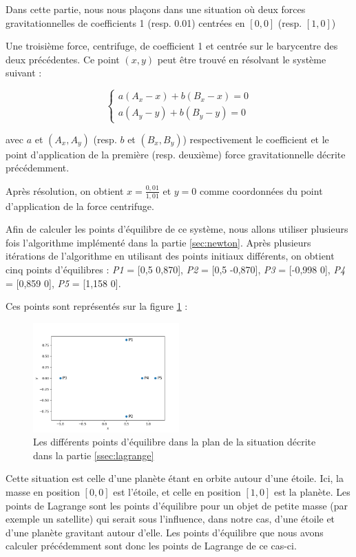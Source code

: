 Dans cette partie, nous nous plaçons dans une situation où deux forces gravitationnelles de coefficients 1 (resp. 0.01) centrées en $[0, 0]$ (resp. $[1, 0]$)

Une troisième force, centrifuge, de coefficient 1 et centrée sur le barycentre des deux précédentes. Ce point $(x, y)$ peut être trouvé en résolvant le système suivant :

$$
\begin{cases}
  a(A_x - x) + b(B_x - x) = 0 \\
  a(A_y - y) + b(B_y - y) = 0
\end{cases}
$$

avec $a$ et $(A_x, A_y)$ (resp. $b$ et $(B_x, B_y)$) respectivement le coefficient et le point d'application de la première (resp. deuxième) force gravitationnelle décrite précédemment.

Après résolution, on obtient $x = \frac{0,01}{1,01}$ et $y = 0$ comme coordonnées du point d'application de la force centrifuge.

\bigskip

Afin de calculer les points d'équilibre de ce système, nous allons utiliser plusieurs fois l'algorithme implémenté dans la partie \ref{sec:newton}. Après plusieurs itérations de l'algorithme en utilisant des points initiaux différents, on obtient cinq points d'équilibres : \emph{P1} = [0,5  0,870], \emph{P2} = [0,5  -0,870], \emph{P3} = [-0,998  0], \emph{P4} = [0,859  0], \emph{P5} = [1,158  0].

Ces points sont représentés sur la figure \ref{fig:equi_pts} :

\begin{figure}[!h]
  \centering
  \includegraphics[width=0.5\textwidth]{img/equilibrium_points.png}
  \caption{Les différents points d'équilibre dans la plan de la situation décrite dans la partie \ref{ssec:lagrange}}
  \label{fig:equi_pts}
\end{figure}

\bigskip

Cette situation est celle d'une planète étant en orbite autour d'une étoile. Ici, la masse en position $[0, 0]$ est l'étoile, et celle en position $[1, 0]$ est la planète. Les points de Lagrange sont les points d'équilibre pour un objet de petite masse (par exemple un satellite) qui serait sous l'influence, dans notre cas, d'une étoile et d'une planète gravitant autour d'elle. Les points d'équilibre que nous avons calculer précédemment sont donc les points de Lagrange de ce cas-ci.

